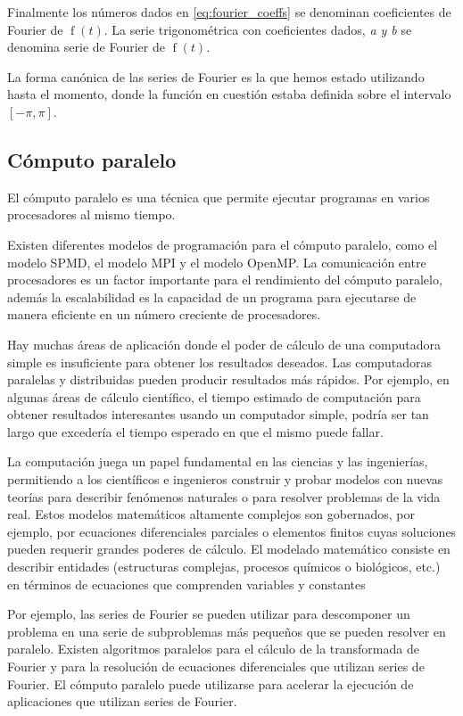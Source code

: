 Finalmente los números dados en \eqref{eq:fourier_coeffs} se denominan coeficientes de Fourier de \(\operatorname{f}(t)\). La serie trigonométrica con coeficientes dados, \emph{a y b} se denomina serie de Fourier de \(\operatorname{f}(t)\).

La forma canónica de las series de Fourier es la que hemos estado utilizando hasta el momento, donde la función en cuestión estaba definida sobre el intervalo \([-\pi, \pi]\).

\subsection{Cómputo paralelo}

El cómputo paralelo es una técnica que permite ejecutar programas en varios procesadores al mismo tiempo.

Existen diferentes modelos de programación para el cómputo paralelo, como el modelo SPMD, el modelo MPI y el modelo OpenMP. La comunicación entre procesadores es un factor importante para el rendimiento del cómputo paralelo, además la escalabilidad es la capacidad de un programa para ejecutarse de manera eficiente en un número creciente de procesadores.

Hay muchas áreas de aplicación donde el poder de cálculo de una computadora simple es insuficiente para obtener los resultados deseados. Las computadoras paralelas y distribuidas pueden producir resultados más rápidos. Por ejemplo, en algunas áreas de cálculo científico, el tiempo estimado de computación para obtener resultados interesantes usando un computador simple, podría ser tan largo que excedería el tiempo esperado en que el mismo puede fallar.

La computación juega un papel fundamental en las ciencias y las ingenierías, permitiendo a los científicos e ingenieros construir y probar modelos con nuevas teorías para describir fenómenos naturales o para resolver problemas de la vida real. Estos modelos matemáticos altamente complejos son gobernados, por ejemplo, por ecuaciones diferenciales parciales o elementos finitos cuyas soluciones pueden requerir grandes poderes de cálculo. El modelado matemático consiste en describir entidades (estructuras complejas, procesos químicos o biológicos, etc.) en términos de ecuaciones que comprenden variables y constantes

Por ejemplo, las series de Fourier se pueden utilizar para descomponer un problema en una serie de subproblemas más pequeños que se pueden resolver en paralelo. Existen algoritmos paralelos para el cálculo de la transformada de Fourier y para la resolución de ecuaciones diferenciales que utilizan series de Fourier. El cómputo paralelo puede utilizarse para acelerar la ejecución de aplicaciones que utilizan series de Fourier.

